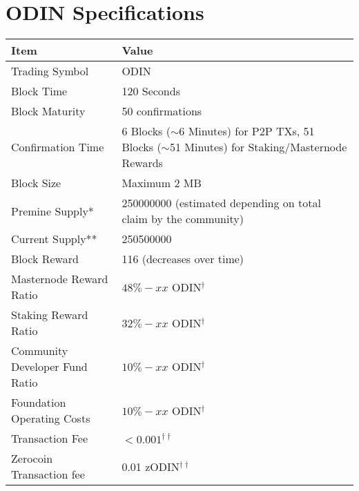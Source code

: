 \section{​ODIN Specifications}\hypertarget{specifications}{}
\begin{center}
\begin{adjustbox}{max width=\textwidth}
\begin{threeparttable}
\renewcommand{\arraystretch}{1.4}
\begin{tabular}{p{6.5cm} p{8cm}}
\hline
Item & Value \\
\hline
\hline
Trading Symbol                          & ODIN                  \\

Block Time                              & 120 Seconds            \\

Block Maturity                          & 50 confirmations      \\

Confirmation Time       & 6 Blocks ($\sim$6 Minutes) for P2P TXs, 51 Blocks ($\sim$51 Minutes) for Staking/Masternode Rewards\\

Block Size              & Maximum 2 MB \\

Premine Supply*          & \num{250000000} (estimated depending on total claim by the community) \tabularnewline

Current Supply**          & \num{250500000} \\

Block Reward            & 116 (decreases over time) \\

Masternode Reward Ratio & $48\% - xx$ ODIN$^\dag$\\

Staking Reward Ratio    & $32\% - xx$ ODIN$^\dag$ \\

Community Developer Fund Ratio & $10\% - xx$ ODIN$^\dag$ \\

Foundation Operating Costs     & $10\% - xx$ ODIN$^\dag$ \\

Transaction Fee         & $< 0.001^{\dag\dag}$ \\

Zerocoin Transaction fee & 0.01 zODIN$^{\dag\dag}$ \\


\end{tabular}
\end{threeparttable}
\end{adjustbox}
\end{center}

